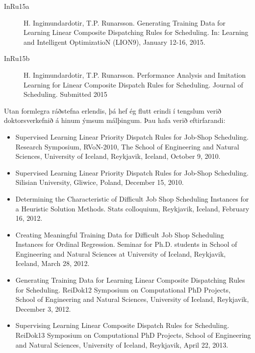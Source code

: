\documentclass{cover}
\begin{document}
{\begin{description}
    \item[InRu15a] H. Ingimundardotir, T.P. Runarsson. Generating Training Data 
    for Learning Linear Composite Dispatching Rules for Scheduling. In: 
    Learning and Intelligent OptimizatioN (LION9), January 12-16, 2015. 
    
    \item[InRu15b] H. Ingimundardotir, T.P. Runarsson. Performance Analysis and 
    Imitation Learning for Linear Composite Dispatch Rules for Scheduling. 
    Journal of Scheduling. Submitted 2015
\end{description}

Utan formlegra ráðstefna erlendis, þá hef ég flutt erindi í tengslum verið 
doktorsverkefnið á hinum ýmsum málþingum. 
Þau hafa verið eftirfarandi:

\begin{itemize}
\item Supervised Learning Linear Priority Dispatch Rules for Job-Shop 
Scheduling. Research Symposium, RVoN-2010, The School of Engineering and 
Natural Sciences, University of Iceland, Reykjavik, Iceland, October 9, 2010.

\item Supervised Learning Linear Priority Dispatch Rules for Job-Shop 
Scheduling. Silisian University, Gliwice, Poland, December 15, 2010.

\item Determining the Characteristic of Difficult Job Shop Scheduling Instances 
for a Heuristic Solution Methods. Stats colloquium, Reykjavik, Iceland, 
February 16, 2012. 

\item Creating Meaningful Training Data for Difficult Job Shop Scheduling 
Instances for Ordinal Regression. Seminar for Ph.D. students in School of 
Engineering and Natural Sciences at University of Iceland, Reykjavik, Iceland, 
March 28, 2012.

\item Generating Training Data for Learning Linear Composite Dispatching Rules 
for Scheduling. ReiDok12 Symposium on Computational PhD Projects, School of 
Engineering and Natural Sciences, University of Iceland, Reykjavik, December 3, 
2012. 

\item Supervising Learning Linear Composite Dispatch Rules for Scheduling. 
ReiDok13 Symposium on Computational PhD Projects, School of Engineering and 
Natural Sciences, University of Iceland, Reykjavik, April 22, 2013. 


\end{itemize}}
\end{document}
